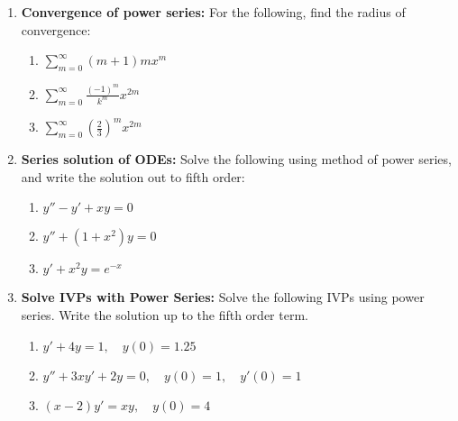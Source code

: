 \documentclass[letterpaper, fontsize=11pt]{scrartcl} %
\numberwithin{equation}{section} %
\numberwithin{figure}{section} %
\numberwithin{table}{section} %
\begin{document}
\begin{enumerate}
\item \textbf{Convergence of power series:} For the following, find the radius of convergence:
\begin{enumerate}
\item $\sum\limits_{m=0}^\infty(m+1)mx^m$

\item $\sum\limits_{m=0}^\infty\frac{(-1)^m}{k^m}x^{2m}$

\item $\sum\limits_{m=0}^\infty \left(\frac{2}{3}\right)^m x^{2m}$

\end{enumerate}

\item \textbf{Series solution of ODEs:} Solve the following using method of power series, and write the solution out to fifth order:
\begin{enumerate}
\item $y'' - y' + xy = 0$

\item $y'' + (1 + x^2) y = 0$

\item $y' + x^2y = e^{-x}$

\end{enumerate}

\item \textbf{Solve IVPs with Power Series:} Solve the following IVPs using power series. Write the solution up to the fifth order term.
\begin{enumerate}
\item $y' + 4y = 1,\quad y(0) = 1.25$

\item $y'' + 3xy' + 2y = 0,\quad y(0) = 1, \quad y'(0) = 1$

\item $(x-2)y' = xy,\quad y(0) = 4$

\end{enumerate}



\end{enumerate}



\end{document}
